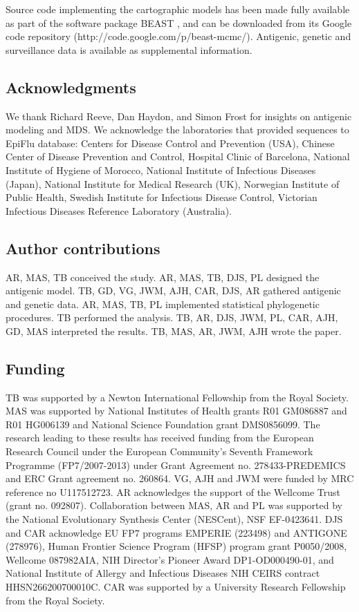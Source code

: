 \documentclass[11pt,oneside,letterpaper]{article}
\begin{document}
Source code implementing the cartographic models has been made fully available as part of the software package BEAST \cite{BEAST17}, and can be downloaded from its Google code repository (http://code.google.com/p/beast-mcmc/).
Antigenic, genetic and surveillance data is available as supplemental information.

\subsection*{Acknowledgments} 

We thank Richard Reeve, Dan Haydon, and Simon Frost for insights on antigenic modeling and MDS.
We acknowledge the laboratories that provided sequences to EpiFlu database: Centers for Disease Control and Prevention (USA), Chinese Center of Disease Prevention and Control, Hospital Clinic of Barcelona, National Institute of Hygiene of Morocco, National Institute of Infectious Diseases (Japan), National Institute for Medical Research (UK), Norwegian Institute of Public Health, Swedish Institute for Infectious Disease Control, Victorian Infectious Diseases Reference Laboratory (Australia).

\subsection*{Author contributions} 

AR, MAS, TB conceived the study.
AR, MAS, TB, DJS, PL designed the antigenic model.
TB, GD, VG, JWM, AJH, CAR, DJS, AR gathered antigenic and genetic data.
AR, MAS, TB, PL implemented statistical phylogenetic procedures.
TB performed the analysis.
TB, AR, DJS, JWM, PL, CAR, AJH, GD, MAS interpreted the results.
TB, MAS, AR, JWM, AJH wrote the paper.

\subsection*{Funding} 

TB was supported by a Newton International Fellowship from the Royal Society. 
MAS was supported by National Institutes of Health grants R01 GM086887 and R01 HG006139 and National Science Foundation grant DMS0856099.
The research leading to these results has received funding from the European Research Council under the European Community's Seventh Framework Programme (FP7/2007-2013) under Grant Agreement no. 278433-PREDEMICS and ERC Grant agreement no. 260864.
VG, AJH and JWM were funded by MRC reference no U117512723.
AR acknowledges the support of the Wellcome Trust (grant no. 092807).
Collaboration between MAS, AR and PL was supported by the National Evolutionary Synthesis Center (NESCent), NSF EF-0423641.
DJS and CAR acknowledge EU FP7 programs EMPERIE (223498) and ANTIGONE (278976), Human Frontier Science Program (HFSP) program grant P0050/2008, Wellcome 087982AIA, NIH Director's Pioneer Award DP1-OD000490-01, and National Institute of Allergy and Infectious Diseases NIH CEIRS contract HHSN266200700010C.
CAR was supported by a University Research Fellowship from the Royal Society.
\end{document}
